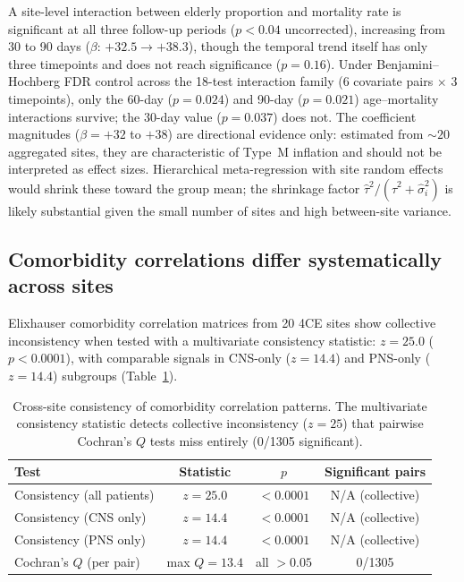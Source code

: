 \documentclass{article}
\begin{document}
A site-level interaction between elderly proportion and mortality rate is
significant at all three follow-up periods ($p < 0.04$ uncorrected),
increasing from 30 to 90 days ($\beta$: $+32.5 \to +38.3$), though the
temporal trend itself has only three timepoints and does not reach
significance ($p = 0.16$).  Under Benjamini--Hochberg FDR control across the
18-test interaction family (6 covariate pairs $\times$ 3 timepoints),
only the 60-day ($p = 0.024$) and 90-day ($p = 0.021$) age--mortality
interactions survive; the 30-day value ($p = 0.037$) does not.  The
coefficient magnitudes ($\beta = +32$ to $+38$) are directional evidence
only: estimated from ${\sim}20$ aggregated sites, they are characteristic
of Type~M inflation \cite{gelman2014typeMS} and should not be interpreted
as effect sizes.  Hierarchical meta-regression with site random effects
\cite{gelman2012multilevel} would shrink these toward the group mean;
the shrinkage factor $\hat\tau^2 / (\hat\tau^2 + \hat\sigma_i^2)$ is
likely substantial given the small number of sites and high between-site
variance.


\subsection{Comorbidity correlations differ systematically across sites}

Elixhauser comorbidity correlation matrices \cite{elixhauser1998} from 20
4CE sites show collective inconsistency when tested with a multivariate
consistency statistic: $z = 25.0$ ($p < 0.0001$), with comparable signals
in CNS-only ($z = 14.4$) and PNS-only ($z = 14.4$) subgroups
(Table~\ref{tab:consistency}).

\begin{table}[t]
\centering
\caption{Cross-site consistency of comorbidity correlation patterns.  The
multivariate consistency statistic detects collective inconsistency
($z = 25$) that pairwise Cochran's $Q$ tests miss entirely (0/1305
significant).}
\label{tab:consistency}
\begin{tabular}{lccc}
\toprule
Test & Statistic & $p$ & Significant pairs \\
\midrule
Consistency (all patients) & $z = 25.0$ & $< 0.0001$ & N/A (collective) \\
Consistency (CNS only) & $z = 14.4$ & $< 0.0001$ & N/A (collective) \\
Consistency (PNS only) & $z = 14.4$ & $< 0.0001$ & N/A (collective) \\
Cochran's $Q$ (per pair) & max $Q = 13.4$ & all $> 0.05$ & 0/1305 \\
\bottomrule
\end{tabular}
\end{table}
\end{document}
